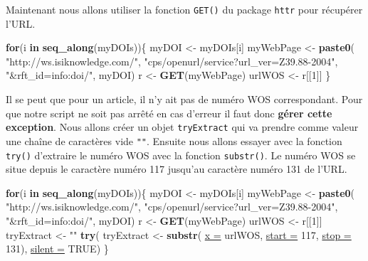 \documentclass[twoside,symmetric]{book}
\newenvironment{Shaded}{}{}
\newcommand{\ControlFlowTok}[1]{\textbf{#1}}
\newcommand{\DataTypeTok}[1]{\underline{#1}}
\newcommand{\DecValTok}[1]{#1}
\newcommand{\KeywordTok}[1]{\textbf{#1}}
\newcommand{\NormalTok}[1]{#1}
\newcommand{\OtherTok}[1]{#1}
\newcommand{\StringTok}[1]{#1}
\begin{document}
Maintenant nous allons utiliser la fonction \texttt{GET()} du package \texttt{httr} pour récupérer l'URL.

\begin{Shaded}
\begin{Highlighting}[]
\ControlFlowTok{for}\NormalTok{(i }\ControlFlowTok{in} \KeywordTok{seq_along}\NormalTok{(myDOIs))\{}
\NormalTok{  myDOI <-}\StringTok{ }\NormalTok{myDOIs[i]}
\NormalTok{  myWebPage <-}\StringTok{ }\KeywordTok{paste0}\NormalTok{(}
    \StringTok{"http://ws.isiknowledge.com/"}\NormalTok{, }
    \StringTok{"cps/openurl/service?url_ver=Z39.88-2004"}\NormalTok{, }
    \StringTok{"&rft_id=info:doi/"}\NormalTok{, myDOI)}
\NormalTok{  r <-}\StringTok{ }\KeywordTok{GET}\NormalTok{(myWebPage)}
\NormalTok{  urlWOS <-}\StringTok{ }\NormalTok{r[[}\DecValTok{1}\NormalTok{]]}
\NormalTok{\}}
\end{Highlighting}
\end{Shaded}

Il se peut que pour un article, il n'y ait pas de numéro WOS correspondant. Pour que notre script ne soit pas arrêté en cas d'erreur il faut donc \textbf{gérer cette exception}. Nous allons créer un objet \texttt{tryExtract} qui va prendre comme valeur une chaîne de caractères vide \texttt{""}. Ensuite nous allons essayer avec la fonction \texttt{try()} d'extraire le numéro WOS avec la fonction \texttt{substr()}. Le numéro WOS se situe depuis le caractère numéro 117 jusqu'au caractère numéro 131 de l'URL.

\begin{Shaded}
\begin{Highlighting}[]
\ControlFlowTok{for}\NormalTok{(i }\ControlFlowTok{in} \KeywordTok{seq_along}\NormalTok{(myDOIs))\{}
\NormalTok{  myDOI <-}\StringTok{ }\NormalTok{myDOIs[i]}
\NormalTok{  myWebPage <-}\StringTok{ }\KeywordTok{paste0}\NormalTok{(}
    \StringTok{"http://ws.isiknowledge.com/"}\NormalTok{, }
    \StringTok{"cps/openurl/service?url_ver=Z39.88-2004"}\NormalTok{, }
    \StringTok{"&rft_id=info:doi/"}\NormalTok{, myDOI)}
\NormalTok{  r <-}\StringTok{ }\KeywordTok{GET}\NormalTok{(myWebPage)}
\NormalTok{  urlWOS <-}\StringTok{ }\NormalTok{r[[}\DecValTok{1}\NormalTok{]]}
\NormalTok{  tryExtract <-}\StringTok{ ""}
  \KeywordTok{try}\NormalTok{(}
\NormalTok{    tryExtract <-}\StringTok{ }\KeywordTok{substr}\NormalTok{(}
      \DataTypeTok{x =}\NormalTok{ urlWOS, }
      \DataTypeTok{start =} \DecValTok{117}\NormalTok{, }
      \DataTypeTok{stop =} \DecValTok{131}\NormalTok{), }
    \DataTypeTok{silent =} \OtherTok{TRUE}\NormalTok{)}
\NormalTok{\}}
\end{Highlighting}
\end{Shaded}
\end{document}
